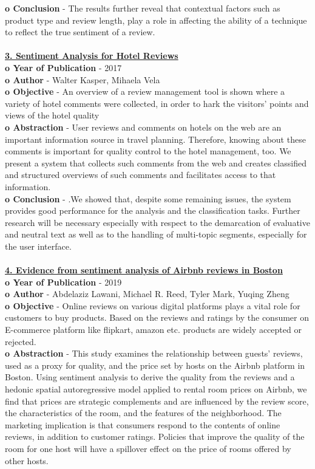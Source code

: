 \documentclass[a4paper, 12pt]{report}
\begin{document}
\textbf{o	Conclusion} - The results further reveal that contextual factors such as product type and review length, play a role in affecting the ability of a technique to reflect the true sentiment of a review. 
\\
\\
\underline{\textbf{3. Sentiment Analysis for Hotel Reviews}}\\
\textbf{o	Year of Publication} - 2017\\
\textbf{o	Author} - Walter Kasper, Mihaela Vela\\
\textbf{o	Objective} - An overview of a review management tool is shown where a variety
of hotel comments were collected, in order to hark the visitors’ points and views
of the hotel quality\\ 
\textbf{o   Abstraction} - User reviews and comments on hotels on the web are  an important information source in travel planning. Therefore,  knowing about these comments is important for quality control  to the hotel management, too. We present a system that collects  such comments from the web and creates classified and structured overviews of such comments and facilitates access to that information.\\ 
\textbf{o	Conclusion} - .We showed that, despite some remaining issues,  the system provides good performance for the analysis and  the classification tasks. Further research will be necessary  especially with respect to the demarcation of evaluative and neutral text as well as to the handling of multi-topic segments,  especially for the user interface. 
\\
\\
\underline{\textbf{4. Evidence from sentiment analysis of Airbnb reviews in Boston}}\\
\textbf{o	Year of Publication} - 2019\\
\textbf{o	Author} - Abdelaziz Lawani, Michael R. Reed, Tyler Mark, Yuqing Zheng\\
\textbf{o	Objective} - Online 
reviews on various digital platforms plays a vital role for customers to buy products. Based on the reviews and 
ratings by the consumer on E-commerce platform like flipkart, amazon etc. products are widely accepted or 
rejected.\\ 
\textbf{o   Abstraction} - This study examines the relationship between guests' reviews, used as a proxy for quality, and the price set by hosts on the Airbnb platform in Boston. Using sentiment analysis to derive the quality from the reviews and a hedonic spatial autoregressive model applied to rental room prices on Airbnb, we find that prices are strategic complements and are influenced by the review score, the characteristics of the room, and the features of the neighborhood. The marketing implication is that consumers respond to the contents of online reviews, in addition to customer ratings. Policies that improve the quality of the room for one host will have a spillover effect on the price of rooms offered by other hosts.\\ 
\end{document}

